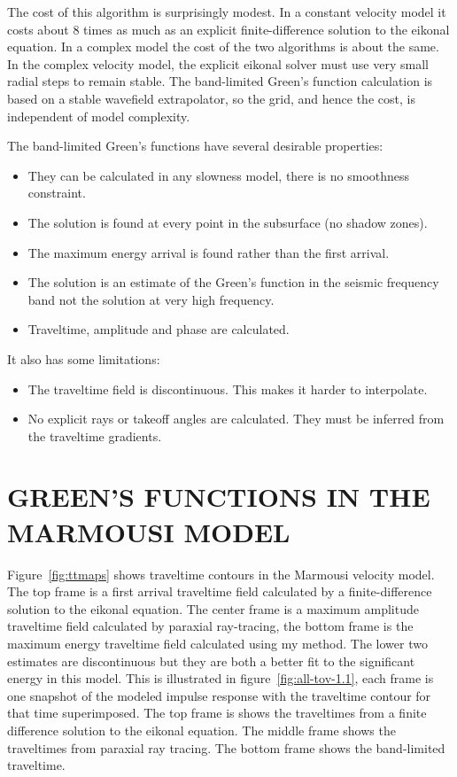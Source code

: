 The cost of this algorithm is surprisingly modest. In a constant
velocity model it costs about 8 times as much as an explicit
finite-difference solution to the eikonal equation.  In a complex
model the cost of the two algorithms is about the same. In the complex
velocity model, the explicit eikonal solver must use very small radial
steps to remain stable. The band-limited Green's function calculation
is based on a stable wavefield extrapolator, so the grid, and hence the
cost, is independent of model complexity.

The band-limited Green's functions have several desirable properties:
\begin{itemize}
\item They can be calculated in any slowness model, there is no
  smoothness constraint.
\item The solution is found at every point in the subsurface (no
  shadow zones).
\item The maximum energy arrival is found rather than the first
  arrival.
\item The solution is an estimate of the Green's function in the
  seismic frequency band not the solution at very high frequency.
\item Traveltime, amplitude and phase are calculated.
\end{itemize}
It also has some limitations:
\begin{itemize}
\item The traveltime field is discontinuous. This makes it harder to
  interpolate.
\item No explicit rays or takeoff angles are calculated. They must be
  inferred from the traveltime gradients.
\end{itemize}

\section{GREEN'S FUNCTIONS IN THE MARMOUSI MODEL}

Figure~\ref{fig:ttmaps} shows traveltime contours in the Marmousi velocity
model.  The top frame is a first arrival traveltime field calculated
by a finite-difference solution to the eikonal equation. The center
frame is a maximum amplitude traveltime field calculated by paraxial
ray-tracing, the bottom frame is the maximum energy traveltime field
calculated using my method. The lower two estimates are
 discontinuous but they are both a better fit to the significant
energy in this model. This is illustrated in figure~\ref{fig:all-tov-1.1},
each frame is one snapshot of the modeled impulse response with the
traveltime contour for that time superimposed. The top frame is shows
the traveltimes from a finite difference solution to the eikonal
equation. The middle frame shows the traveltimes from paraxial ray
tracing. The bottom frame shows the band-limited traveltime.

